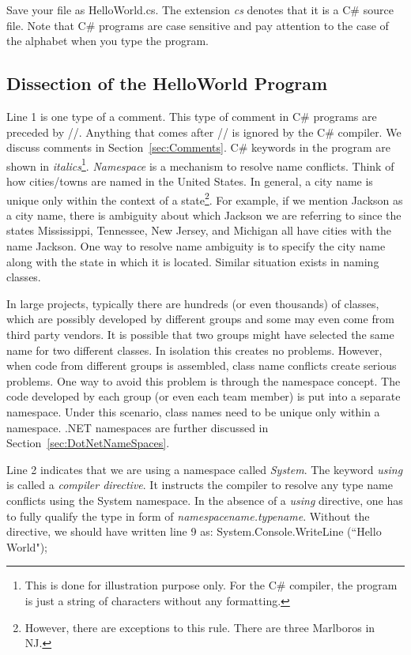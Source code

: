 Save your file as HelloWorld.cs. The extension \emph{cs} denotes
that it is a C\# source file. Note that C\# programs are case
sensitive and pay attention to the case of the alphabet when you
type the program.

\subsection{Dissection of the HelloWorld Program}

Line 1 is one type of a comment. This type of comment in C\#
programs are preceded by //. Anything that comes after // is
ignored by the C\# compiler. We discuss comments in
Section~\ref{sec:Comments}. C\# keywords in the program are shown
in \emph{italics}\footnote{This is done for illustration purpose
only. For the C\# compiler, the program is just a string of
characters without any formatting.}. \emph{Namespace} is a
mechanism to resolve name conflicts. Think of how cities/towns are
named in the United States. In general, a city name is unique only
within the context of a state\footnote{However, there are
exceptions to this rule. There are three Marlboros in NJ.}. For
example, if we mention Jackson as a city name, there is ambiguity
about which Jackson we are referring to since the states
Mississippi, Tennessee, New Jersey, and Michigan all have cities
with the name Jackson. One way to resolve name ambiguity is to
specify the city name along with the state in which it is located.
Similar situation exists in naming classes.

In large projects, typically there are hundreds (or even
thousands) of classes, which are possibly developed by different
groups and some may even come from third party vendors. It is
possible that two groups might have selected the same name for two
different classes. In isolation this creates no problems. However,
when code from different groups is assembled, class name conflicts
create serious problems. One way to avoid this problem is through
the namespace concept. The code developed by each group (or even
each team member) is put into a separate namespace. Under this
scenario, class names need to be unique only within a namespace.
.NET namespaces are further discussed in
Section~\ref{sec:DotNetNameSpaces}.

Line 2 indicates that we are using a namespace called
\emph{System}. The keyword \emph{using} is called a \emph{compiler
directive}. It instructs the compiler to resolve any type name
conflicts using the System namespace. In the absence of a
\emph{using} directive, one has to fully qualify the type in form
of \emph{namespacename.typename}. Without the directive, we should
have written line 9 as: System.Console.WriteLine (``Hello World");

